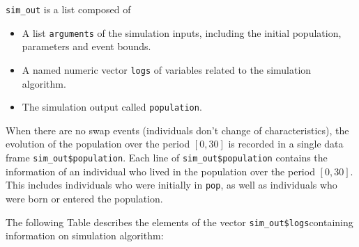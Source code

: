\texttt{sim\_out} is a list composed of

\begin{itemize}
\tightlist
\item
  A list \texttt{arguments} of the simulation inputs, including the initial population, parameters and event bounds.
\item
  A named numeric vector \texttt{logs} of variables related to the simulation algorithm.
\item
  The simulation output called \texttt{population}.
\end{itemize}

When there are no swap events (individuals don't change of characteristics), the evolution of the population over the period \([0,30]\) is recorded in a single data frame \texttt{sim\_out\$population}.
Each line of \texttt{sim\_out\$population} contains the information of an individual who lived in the population over the period \([0,30]\). This includes individuals who were initially in \texttt{pop}, as well as individuals who were born or entered the population.

\begin{Shaded}
\begin{Highlighting}[]
\OperatorTok{$}
\end{Highlighting}
\end{Shaded}

The following Table describes the elements of the vector \texttt{sim\_out\$logs}containing information on simulation algorithm:

